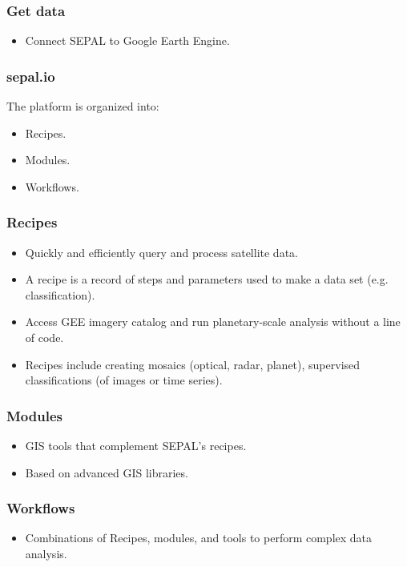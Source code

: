 \begin{frame}
	\frametitle{Get data}
	\begin{itemize}
		\item Connect SEPAL to Google Earth Engine.
	\end{itemize}
\end{frame}

\begin{frame}
	\frametitle{sepal.io}
	The platform is organized into:
	\begin{itemize}
		\item Recipes.
		\item Modules.
		\item Workflows.
	\end{itemize}
\end{frame}

\begin{frame}
	\frametitle{Recipes}
	\begin{itemize}
		\item Quickly and efficiently query and process satellite data.
		\item A recipe is a record of steps and parameters used to make a
		      data set (e.g. classification).
		\item Access GEE imagery catalog and run planetary-scale analysis
		      without a line of code.
		\item Recipes include creating mosaics (optical, radar, planet),
		      supervised classifications (of images or time series).
	\end{itemize}
\end{frame}

\begin{frame}
	\frametitle{Modules}
	\begin{itemize}
		\item GIS tools that complement SEPAL's recipes.
		\item Based on advanced GIS libraries.
	\end{itemize}
\end{frame}

\begin{frame}
	\frametitle{Workflows}
	\begin{itemize}
		\item Combinations of Recipes, modules, and tools to perform complex
		      data analysis.
	\end{itemize}
\end{frame}

